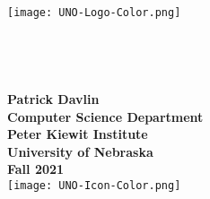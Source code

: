 \begin{center}
  \texttt{[image: UNO-Logo-Color.png]}
  \\[0.3in]
  \textbf{\courseListing{}}\\
  \courseName{}
  \\[0.75in]
  \textbf{\assignmentTitle{}}\\
  \assignmentSubtitle{}
  \\[0.75in]
  \textbf{Patrick Davlin}
  \\[0.75in]
  \textbf{Computer Science Department}\\
  \textbf{Peter Kiewit Institute}\\
  \textbf{University of Nebraska}
  \\[0.75in]
  \textbf{Fall 2021}
  \\[0.3in]
  \texttt{[image: UNO-Icon-Color.png]}
  \newpage
\end{center}